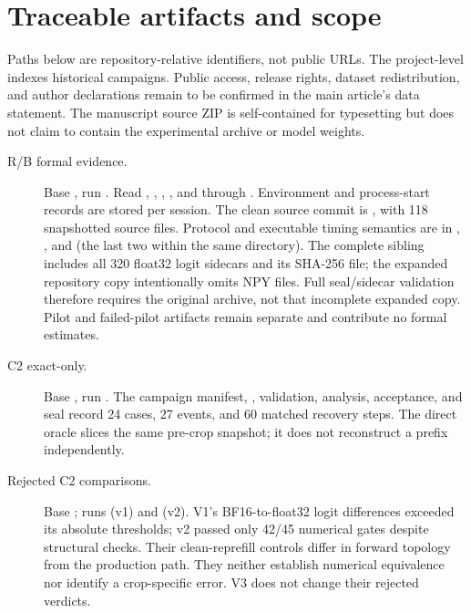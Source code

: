 \documentclass[12pt]{article}
\begin{document}
\section{Traceable artifacts and scope}
\label{sec:s-artifacts}

Paths below are repository-relative identifiers, not public URLs. The project-level  indexes historical campaigns. Public access, release rights, dataset redistribution, and author declarations remain to be confirmed in the main article's data statement. The manuscript source ZIP is self-contained for typesetting but does not claim to contain the experimental archive or model weights.

\begin{description}
\item[R/B formal evidence.] Base , run . Read , , , , and  through . Environment and process-start records are stored per session. The clean source commit is , with 118 snapshotted source files. Protocol and executable timing semantics are in , , and  (the last two within the same directory). The complete sibling  includes all 320 float32 logit sidecars and its SHA-256 file; the expanded repository copy intentionally omits NPY files. Full seal/sidecar validation therefore requires the original archive, not that incomplete expanded copy. Pilot and failed-pilot artifacts remain separate and contribute no formal estimates.
\item[C2 exact-only.] Base , run . The campaign manifest, , validation, analysis, acceptance, and seal record 24 cases, 27 events, and 60 matched recovery steps. The direct oracle slices the same pre-crop snapshot; it does not reconstruct a prefix independently.
\item[Rejected C2 comparisons.] Base ; runs  (v1) and  (v2). V1's BF16-to-float32 logit differences exceeded its absolute thresholds; v2 passed only 42/45 numerical gates despite structural checks. Their clean-reprefill controls differ in forward topology from the production path. They neither establish numerical equivalence nor identify a crop-specific error. V3 does not change their rejected verdicts.

\end{description}
\end{document}
